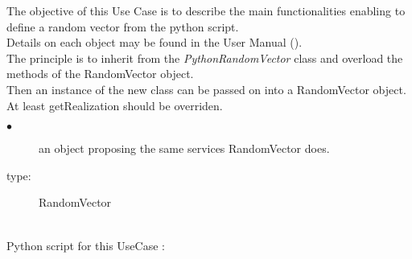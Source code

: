 \renewcommand{\filename}{docUC_InputNoData_CustomRandVectFromPython.tex}
\renewcommand{\filetitle}{UC : Creation of a custom random vector from the python script}

\HeaderIIILevel


\label{manipulation_random vector}

The objective of this Use Case is to describe the main functionalities enabling to define a random vector from the python script.\\



Details on each object may be found in the User Manual  ().\\

The principle is to inherit from the \textit{PythonRandomVector} class and overload the methods of the RandomVector object.\\
Then an instance of the new class can be passed on into a RandomVector object.\\
At least getRealization should be overriden.

             {
               \begin{description}
               \item[$\bullet$] an object proposing the same services RandomVector does.
               \item[type:] RandomVector
               \end{description}
             }

             \textspace\\
             Python script for this UseCase :

